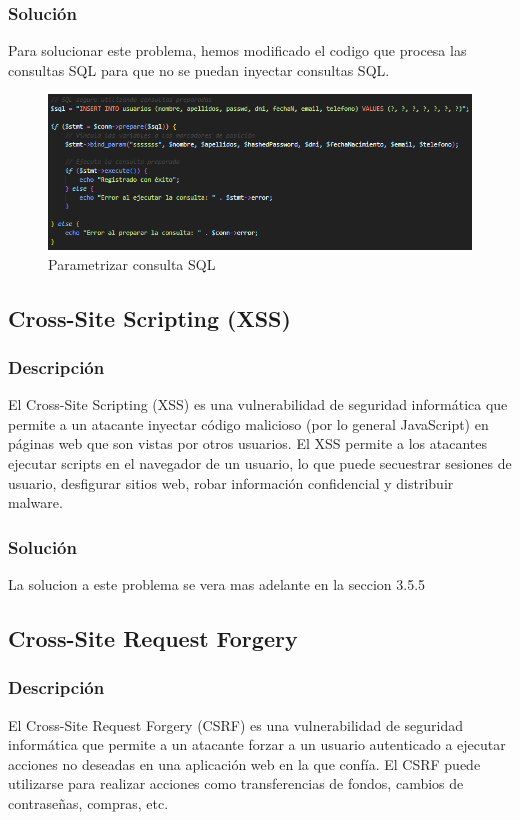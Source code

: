 \documentclass{report}
\begin{document}
                \subsubsection{Solución}
                    Para solucionar este problema, hemos modificado el codigo que procesa las consultas SQL para que no se puedan inyectar consultas SQL.
                    \begin{figure}[H]
                        \centering
                        \includegraphics[width=\textwidth]{./img/vulnerabilidades/3.3/1.1.png}
                        \caption{Parametrizar consulta SQL}
                    \end{figure}
            \clearpage
            \subsection{Cross-Site Scripting (XSS)}
                \subsubsection{Descripción}
                    El Cross-Site Scripting (XSS) es una vulnerabilidad de seguridad informática que permite a un atacante inyectar código malicioso (por lo general JavaScript) en páginas web que son vistas por otros usuarios. El XSS permite a los atacantes ejecutar scripts en el navegador de un usuario, lo que puede secuestrar sesiones de usuario, desfigurar sitios web, robar información confidencial y distribuir malware.
                \subsubsection{Solución}
                    La solucion a este problema se vera mas adelante en la seccion 3.5.5
            \clearpage
            \subsection{Cross-Site Request Forgery}
                \subsubsection{Descripción}
                    El Cross-Site Request Forgery (CSRF) es una vulnerabilidad de seguridad informática que permite a un atacante forzar a un usuario autenticado a ejecutar acciones no deseadas en una aplicación web en la que confía. El CSRF puede utilizarse para realizar acciones como transferencias de fondos, cambios de contraseñas, compras, etc.
\end{document}
